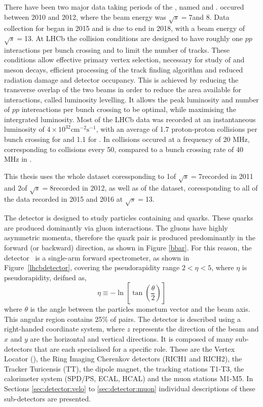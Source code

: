 There have been two major data taking periods of the \lhc, named \runone and \runtwo. \runone occured between 2010 and 2012, where the beam energy was $\sqrt{s}=$7\tev and 8\tev. Data collection for \runtwo began in 2015 and is due to end in 2018, with a beam energy of $\sqrt{s}=$13\tev. At LHCb the collision conditions are designed to have roughly one $pp$ interactions per bunch crossing and to limit the number of tracks. These conditions allow effective primary vertex selection, necessary for study of \B and \D meson decays, efficient processing of the track finding algorithm and reduced radiation damage and detector occupancy. This is achieved by reducing the transverse overlap of the two beams in order to reduce the area available for interactions, called luminosity levelling. It allows the peak luminosity and number of $pp$ intereactions per bunch crossing to be optimal, while maximising the intergrated luminosity. Most of the LHCb data was recorded at an instantaneous luminosity of $4 \times 10^{32}\text{cm}^{-2}\text{s}^{-1}$, with an average of 1.7 proton-proton collisions per bunch crossing for \runone and 1.1 for \runtwo. In \runone collisions occured at a frequency of 20 MHz, corresponding to collisions every 50\ns, compared to a bunch crossing rate of 40 MHz in \runtwo.

This thesis uses the whole \runonelumi \runone dataset coressponding to 1\invfb of $\sqrt{s}=$7\tev recorded in 2011 and 2\invfb of $\sqrt{s}=$8\tev recorded in 2012, as well as \runtwolumi of the \runtwo dataset, coressponding to all of the data recorded in 2015 and 2016 at $\sqrt{s}=$13\tev.

The \lhcb detector is designed to study particles containing \bquark and \cquark quarks. These quarks are produced dominantly via gluon interactions. The gluons have highly asymmetric momenta, therefore the \bquark\bquarkbar quark pair is produced predominantly in the forward (or backward) direction, as shown in Figure \ref{bbar}. For this reason, the \lhcb detector~\cite{Alves:2008zz,LHCb-DP-2014-002} is a single-arm forward spectrometer, as shown in Figure~\ref{lhcbdetector}, covering the \mbox{pseudorapidity} range $2<\eta <5$, where $\eta$ is pseudorapidity, deifned as,
\begin{equation}
\eta \equiv -\ln \left[ \tan \left( \frac{\theta}{2} \right) \right]
\end{equation}
where $\theta$ is the angle between the particles mometum vector and the beam axis. This angular region contains 25\% of \bquark\bquarkbar pairs. The detector is described using a right-handed coordinate system, where $z$ represents the direction of the beam and $x$ and $y$ are the horizontal and vertical directions. It is composed of many sub-detectors that are each specialised for a specific role. These are the Vertex Locator (\velo), the Ring Imaging Cherenkov detectors (RICH1 and RICH2), the Tracker Turicensis (TT), the dipole magnet, the tracking stations T1-T3, the calorimeter system (SPD/PS, ECAL, HCAL) and the muon stations M1-M5. In Sections \ref{sec:detector:velo} to \ref{sec:detector:muon} individual descriptions of these sub-detectors are presented.

